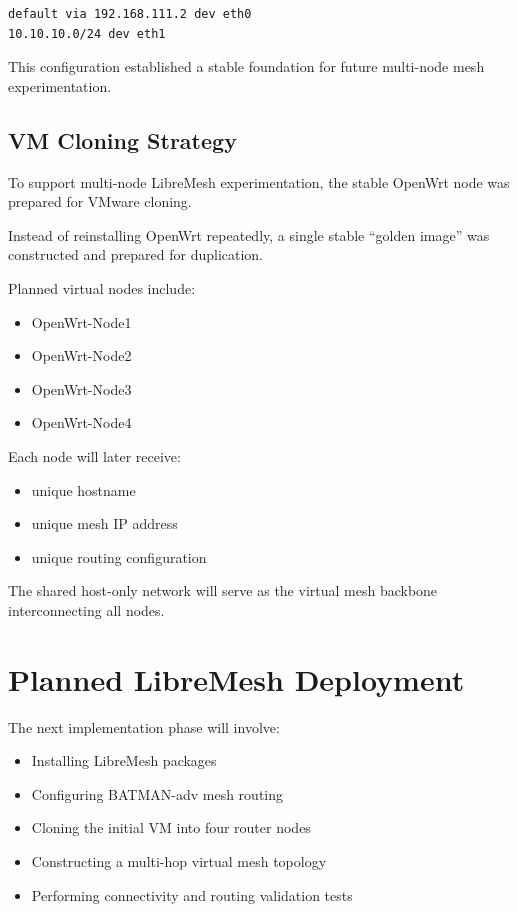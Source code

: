 \documentclass[conference]{IEEEtran}
\begin{document}
\begin{verbatim}
default via 192.168.111.2 dev eth0
10.10.10.0/24 dev eth1
\end{verbatim}

This configuration established a stable foundation for future multi-node mesh experimentation.

\subsection{VM Cloning Strategy}

To support multi-node LibreMesh experimentation, the stable OpenWrt node was prepared for VMware cloning.

Instead of reinstalling OpenWrt repeatedly, a single stable “golden image” was constructed and prepared for duplication.

Planned virtual nodes include:

\begin{itemize}
    \item OpenWrt-Node1
    \item OpenWrt-Node2
    \item OpenWrt-Node3
    \item OpenWrt-Node4
\end{itemize}

Each node will later receive:
\begin{itemize}
    \item unique hostname
    \item unique mesh IP address
    \item unique routing configuration
\end{itemize}

The shared host-only network will serve as the virtual mesh backbone interconnecting all nodes.

\section{Planned LibreMesh Deployment}

The next implementation phase will involve:

\begin{itemize}
    \item Installing LibreMesh packages
    \item Configuring BATMAN-adv mesh routing
    \item Cloning the initial VM into four router nodes
    \item Constructing a multi-hop virtual mesh topology
    \item Performing connectivity and routing validation tests
\end{itemize}
\end{document}
